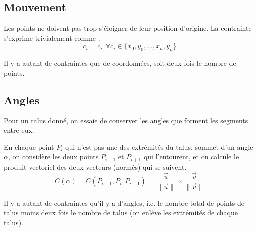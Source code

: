 \documentclass[11pt]{article}
\begin{document}
\subsection{Mouvement}
Les points ne doivent pas trop s'éloigner de leur position d'origine. La contrainte s'exprime trivialement comme :
\begin{equation}
c_i = c_i\  \ \forall c_i \in \lbrace x_0, y_0, \ldots , x_n, y_n \rbrace
\label{movement}
\end{equation}

Il y a autant de contraintes que de coordonnées, soit deux fois le nombre de points.

\subsection{Angles}
Pour un talus donné, on essaie de conserver les angles que forment les segments entre eux.

\begin{center}
\end{center}

En chaque point $P_i$ qui n'est pas une des extrémités du talus, sommet d'un angle $\alpha$, on considère les deux points $P_{i-1}$ et $P_{i+1}$ qui l'entourent, et on calcule le produit vectoriel des deux vecteurs (normés) qui se suivent.
\begin{equation}
C(\alpha) = C(P_{i-1},P_{i}, P_{i+1}) = \frac{\vec{u}}{\lVert \vec{u} \rVert} \times \frac{\vec{v}}{\lVert \vec{v} \rVert} 
\label{crossprod}
\end{equation}

Il y a autant de contraintes qu'il y a d'angles, i.e. le nombre total de points de talus moins deux fois le nombre de talus (on enlève les extrémités de chaque talus).
\end{document}
